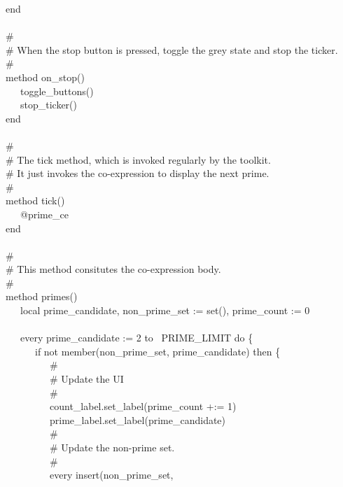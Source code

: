 {\>   end \\
\ \\
\>   \# \\
\>   \# When the stop button is pressed, toggle the grey state and stop the ticker. \\
\>   \#  \\
\>   method on\_stop() \\
\>   \ \ \ toggle\_buttons() \\
\>   \ \ \ stop\_ticker() \\
\>   end \\
\ \\
\>   \# \\
\>   \# The tick method, which is invoked regularly by the toolkit. \\
\>   \# It just invokes the co-expression to display the next prime. \\
\>   \# \\
\>   method tick() \\
\>   \ \ \ @prime\_ce \\
\>   end \\
\ \\
\>   \# \\
\>   \# This method consitutes the co-expression body. \\
\>   \# \\
\>   method primes() \\
\>   \ \ \ local prime\_candidate, non\_prime\_set := set(), prime\_count := 0 \\
\ \\
\>   \ \ \ every prime\_candidate := 2 to \ PRIME\_LIMIT do \{ \\
\>   \ \ \ \ \ \ if not member(non\_prime\_set, prime\_candidate) then
\{ \\
\>   \ \ \ \ \ \ \ \ \ \# \\
\>   \ \ \ \ \ \ \ \ \ \# Update the UI \\
\>   \ \ \ \ \ \ \ \ \ \# \\
\>   \ \ \ \ \ \ \ \ \ count\_label.set\_label(prime\_count +:= 1) \\
\>   \ \ \ \ \ \ \ \ \ prime\_label.set\_label(prime\_candidate) \\
\>   \ \ \ \ \ \ \ \ \ \# \\
\>   \ \ \ \ \ \ \ \ \ \# Update the non-prime set. \\
\>   \ \ \ \ \ \ \ \ \ \# \\
\>   \ \ \ \ \ \ \ \ \ every insert(non\_prime\_set,\\
}

